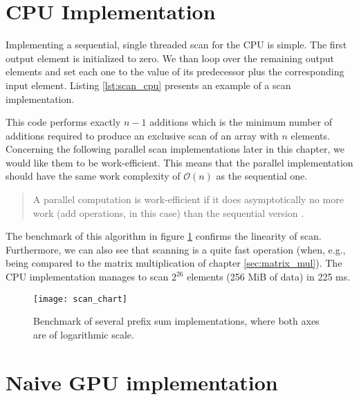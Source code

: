 \section{CPU Implementation}
\label{sec:scan_cpu}

Implementing a sequential, single threaded scan for the CPU is simple. The first output element is initialized to zero. We than loop over the remaining output elements and set each one to the value of its predecessor plus the corresponding input element. Listing \ref{lst:scan_cpu} presents an example of a scan implementation.



This code performs exactly $n - 1$ additions which is the minimum number of additions required to produce an exclusive scan of an array with $n$ elements. Concerning the following parallel scan implementations later in this chapter, we would like them to be work-efficient. This means that the parallel implementation should have the same work complexity of $\mathcal{O}(n)$ as the sequential one.

\begin{quote}
A parallel computation is work-efficient if it does asymptotically no more work (add operations, in this case) than the sequential version \cite{gpu_gems_3_chapter_39}.
\end{quote}

The benchmark of this algorithm in figure \ref{fig:scan_chart} confirms the linearity of scan. Furthermore, we can also see that scanning is a quite fast operation (when, e.g., being compared to the matrix multiplication of chapter \ref{sec:matrix_mul}). The CPU implementation manages to scan $2^{26}$ elements (256 MiB of data) in 225 ms.

\begin{figure}[!p]
\centering
\texttt{[image: scan\_chart]}
\caption{Benchmark of several prefix sum implementations, where
both axes are of logarithmic scale.}
\label{fig:scan_chart}
\end{figure}

\section{Naive GPU implementation}
\label{sec:scan_naive}

